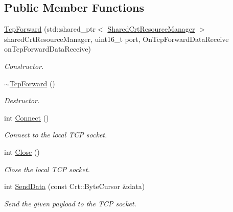 \subsection*{Public Member Functions}
\begin{DoxyCompactItemize}
\item 
\hyperlink{class_aws_1_1_iot_1_1_device_client_1_1_secure_tunneling_1_1_tcp_forward_ab7c56677f6f28b12223830a238bd9a17}{Tcp\+Forward} (std\+::shared\+\_\+ptr$<$ \hyperlink{class_aws_1_1_iot_1_1_device_client_1_1_shared_crt_resource_manager}{Shared\+Crt\+Resource\+Manager} $>$ shared\+Crt\+Resource\+Manager, uint16\+\_\+t port, On\+Tcp\+Forward\+Data\+Receive on\+Tcp\+Forward\+Data\+Receive)
\begin{DoxyCompactList}\small\item\em Constructor. \end{DoxyCompactList}\item 
\mbox{\label{class_aws_1_1_iot_1_1_device_client_1_1_secure_tunneling_1_1_tcp_forward_a5c893165a638399f815c7889d66096f6}} 
\hyperlink{class_aws_1_1_iot_1_1_device_client_1_1_secure_tunneling_1_1_tcp_forward_a5c893165a638399f815c7889d66096f6}{$\sim$\+Tcp\+Forward} ()
\begin{DoxyCompactList}\small\item\em Destructor. \end{DoxyCompactList}\item 
\mbox{\label{class_aws_1_1_iot_1_1_device_client_1_1_secure_tunneling_1_1_tcp_forward_a13b963b1009718b84b79e7b2943792a5}} 
int \hyperlink{class_aws_1_1_iot_1_1_device_client_1_1_secure_tunneling_1_1_tcp_forward_a13b963b1009718b84b79e7b2943792a5}{Connect} ()
\begin{DoxyCompactList}\small\item\em Connect to the local T\+CP socket. \end{DoxyCompactList}\item 
\mbox{\label{class_aws_1_1_iot_1_1_device_client_1_1_secure_tunneling_1_1_tcp_forward_af0961f83e2e761252a7560616f927593}} 
int \hyperlink{class_aws_1_1_iot_1_1_device_client_1_1_secure_tunneling_1_1_tcp_forward_af0961f83e2e761252a7560616f927593}{Close} ()
\begin{DoxyCompactList}\small\item\em Close the local T\+CP socket. \end{DoxyCompactList}\item 
int \hyperlink{class_aws_1_1_iot_1_1_device_client_1_1_secure_tunneling_1_1_tcp_forward_aa20aab4ae6ecd3004100da9976b95310}{Send\+Data} (const Crt\+::\+Byte\+Cursor \&data)
\begin{DoxyCompactList}\small\item\em Send the given payload to the T\+CP socket. \end{DoxyCompactList}\end{DoxyCompactItemize}
